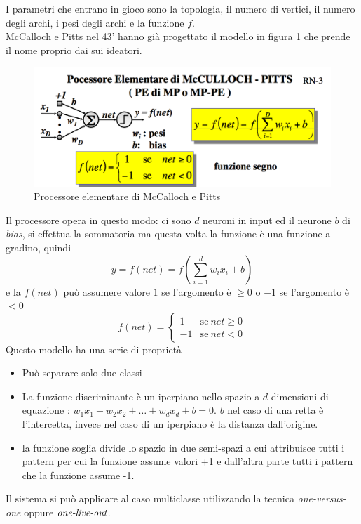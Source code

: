 \noindent I parametri che entrano in gioco sono la topologia, il numero di vertici, il numero degli archi, i pesi degli archi e la funzione $f$.\\

\noindent McCalloch e Pitts nel 43' hanno già progettato il modello in figura \ref{pemc} che prende il nome proprio dai sui ideatori.
\begin{figure}
\centering
\includegraphics[scale=0.5]{img/PEMC.png}
\caption{Processore elementare di McCalloch e Pitts }
\label{pemc}
\end{figure}
Il processore opera in questo modo:  ci sono $d$ neuroni in input ed il neurone $b$ di \emph{bias}, si effettua la sommatoria ma questa volta la funzione è una funzione a gradino, quindi 
\begin{equation}
y=f(net) = f \left( \sum_{i=1}^d w_i x_i +b\right)
\end{equation}
e la $f(net)$ può assumere valore $1$ se l'argomento è $\geq 0$ o $-1$ se l'argomento è $< 0$
\[
f(net)=
\begin{cases}
1 & \text{se} \ net \geq 0\\
-1 & \text{se} \ net < 0 
\end{cases} 
\]
\noindent Questo modello ha una serie di proprietà
\begin{itemize}
\item Può separare solo due classi
\item La funzione discriminante è un iperpiano nello spazio a $d$ dimensioni di equazione : $w_1 x_1 + w_2 x_2 + \dots + w_d x_d + b = 0$. $b$  nel caso di una retta è l'intercetta, invece nel caso di un iperpiano è la distanza dall'origine.
\item la funzione soglia divide lo spazio in due semi-spazi a cui attribuisce tutti i pattern per cui la funzione assume valori +1 e dall'altra parte tutti i pattern che la funzione assume  -1.
\end{itemize}
Il sistema si può applicare al caso multiclasse utilizzando la tecnica \emph{one-versus-one} oppure $\emph{one-live-out}$.\\


